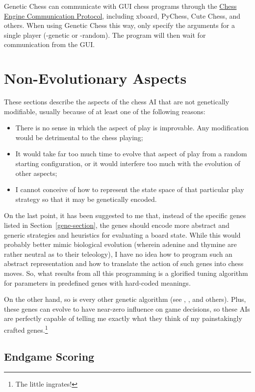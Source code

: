 \documentclass[letterpaper]{article}
\newcommand{\code}[1]{\textsf{#1}}
\renewcommand{\_}{\allowbreak\textunderscore\allowbreak}
\begin{document}
Genetic Chess can communicate with GUI chess programs through the \href{https://www.gnu.org/software/xboard/engine-intf.html}{Chess Engine Communication Protocol}, including xboard, PyChess, Cute Chess, and others. When using Genetic Chess this way, only specify the arguments for a single player (\code{-genetic} or \code{-random}). The program will then wait for communication from the GUI.


\section{Non-Evolutionary Aspects}

These sections describe the aspects of the chess AI that are not genetically modifiable, usually because of at least one of the following reasons:
\begin{itemize}
	\item There is no sense in which the aspect of play is improvable. Any modification would be detrimental to the chess playing;
	\item It would take far too much time to evolve that aspect of play from a random starting configuration, or it would interfere too much with the evolution of other aspects;
	\item I cannot conceive of how to represent the state space of that particular play strategy so that it may be genetically encoded.
\end{itemize}
On the last point, it has been suggested to me that, instead of the specific genes listed in Section~\ref{gene-section}, the genes should encode more abstract and generic strategies and heuristics for evaluating a board state. While this would probably better mimic biological evolution (wherein adenine and thymine are rather neutral as to their teleology), I have no idea how to program such an abstract representation and how to translate the action of such genes into chess moves. So, what results from all this programming is a glorified tuning algorithm for parameters in predefined genes with hard-coded meanings.

On the other hand, so is every other genetic algorithm (see \cite{evolved-antenna}, \cite{evolved-stellarator}, and others). Plus, these genes can evolve to have near-zero influence on game decisions, so these AIs are perfectly capable of telling me exactly what they think of my painstakingly crafted genes.\footnote{The little ingrates!}

\subsection{Endgame Scoring}
\end{document}
